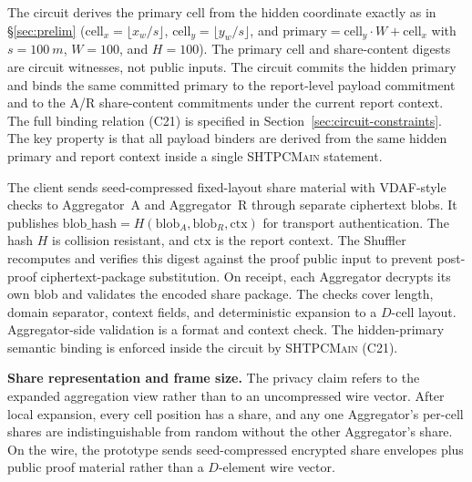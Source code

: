 \documentclass[journal]{IEEEtran}
\theoremstyle{definition}
\theoremstyle{plain}
\begin{document}
The circuit derives the primary cell from the hidden coordinate exactly as in
\S\ref{sec:prelim} ($\mathrm{cell}_x=\lfloor x_w/s\rfloor$,
$\mathrm{cell}_y=\lfloor y_w/s\rfloor$, and
$\mathrm{primary}=\mathrm{cell}_y\cdot W+\mathrm{cell}_x$ with
$s=\SI{100}{m}$, $W=100$, and $H=100$). The primary cell and share-content digests are
circuit witnesses, not public inputs. The circuit commits the hidden primary and
binds the same committed primary to the report-level payload commitment and to
the A/R share-content commitments under the current report context. The full
binding relation (C21) is specified in Section~\ref{sec:circuit-constraints}. The key
property is that all payload binders are derived from the same hidden primary and
report context inside a single \textsc{SHTPCMain} statement.

The client sends seed-compressed fixed-layout share material with VDAF-style
checks to Aggregator~A and Aggregator~R through separate ciphertext blobs. It publishes
$\mathrm{blob\_hash}=H(\mathrm{blob}_A,\mathrm{blob}_R,\mathrm{ctx})$ for
transport authentication. The hash $H$ is collision resistant, and
$\mathrm{ctx}$ is the report context. The Shuffler recomputes and verifies this
digest against the proof public input to prevent post-proof ciphertext-package
substitution. On receipt, each Aggregator decrypts its own blob and validates
the encoded share package. The checks cover length, domain separator, context
fields, and deterministic expansion to a \(D\)-cell layout. Aggregator-side
validation is a format and context check. The hidden-primary semantic binding
is enforced inside the circuit by \textsc{SHTPCMain} (C21).

\noindent\textbf{Share representation and frame size.}
The privacy claim refers to the expanded aggregation view rather than to an
uncompressed wire vector. After local expansion, every cell position has a
share, and any one Aggregator's per-cell shares are indistinguishable from
random without the other Aggregator's share. On the wire, the prototype sends
seed-compressed encrypted share envelopes plus public proof material rather
than a \(D\)-element wire vector.
\end{document}
